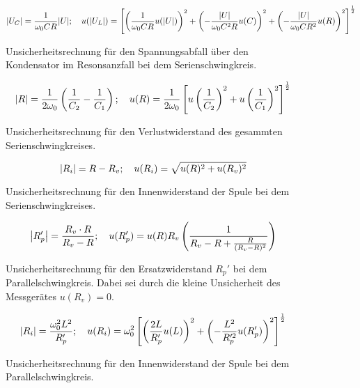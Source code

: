 \begin{figure}[h]
\begin{equation*}
\abs{U_C} = \frac{1}{\omega_0 C R} \abs{U}
;\quad
u(\abs{U_L}) = \left[ \left( \frac{1}{\omega_0 C R} u(\abs{U}) \right) ^2+\left( -\frac{\abs{U}}{\omega_0 C^2 R} u(C) \right) ^2+\left( -\frac{\abs{U}}{\omega_0 C R^2} u(R) \right) ^2 \right] ^{\frac{1}{2}}
\end{equation*}
\caption{Unsicherheitsrechnung für den Spannungsabfall über den Kondensator im Resonsanzfall bei dem Serienschwingkreis.}
\label{eq:U_C=U/wCR}
\end{figure}

\begin{figure}[h]
\begin{equation*}
\abs{R} = \frac{1}{2\omega_0}\left( \frac{1}{C_2} - \frac{1}{C_1} \right) 
;\quad
u(R) = \frac{1}{2\omega_0} \left[ u\left( \frac{1}{C_2 }\right) ^2 + u\left( \frac{1}{C_1} \right) ^2 \right] ^{\frac{1}{2}}
\end{equation*}
\caption{Unsicherheitsrechnung für den Verlustwiderstand des gesammten Serienschwingkreises.}
\label{eq:R=dC/2w}
\end{figure}

\begin{figure}[h]
\begin{equation*}
\abs{R_i} = R - R_v
;\quad
u(R_i) = \sqrt{u(R)^2 + u(R_v)^2}
\end{equation*}
\caption{Unsicherheitsrechnung für den Innenwiderstand der Spule bei dem Serienschwingkreises.}
\label{eq:R_i-serie}
\end{figure}

\begin{figure}[h]
\begin{equation*}
\abs{R_p'} = \frac{R_v \cdot R}{R_v-R}
;\quad
u(R_p') = u(R) R_v \left( \frac{1}{R_v - R + \frac{R}{(R_v - R)^2}} \right) 
\end{equation*}
\caption{Unsicherheitsrechnung für den Ersatzwiderstand $R_p'$ bei dem Parallelschwingkreis. Dabei sei durch die kleine Unsicherheit des Messgerätes $u(R_v) = 0$.}
\label{eq:R_p-parallel}
\end{figure}

\begin{figure}[h]
\begin{equation*}
\abs{R_i} = \frac{\omega_0^2 L^2}{R_p'}
;\quad
u(R_i) = \omega_0^2 \left[ \left( \frac{2 L}{R_p'} u(L) \right) ^2 + \left( -\frac{L^2}{R_p'^2} u(R_p') \right) ^2 \right] ^{\frac{1}{2}}
\end{equation*}
\caption{Unsicherheitsrechnung für den Innenwiderstand der Spule bei dem Parallelschwingkreis.}
\label{eq:R_i-parallel}
\end{figure}



